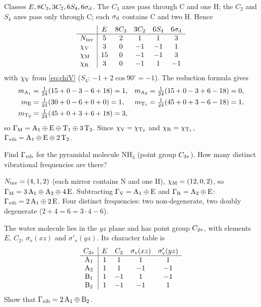 \begin{solution}
Classes $E,8C_3,3C_2,6S_4,6\sigma_{\mathrm{d}}$. The $C_3$ axes pass through C and one H; the $C_2$ and
$S_4$ axes pass only through C; each $\sigma_{\mathrm{d}}$ contains C and two H. Hence
\[
\begin{array}{l|ccccc}
 & E & 8C_3 & 3C_2 & 6S_4 & 6\sigma_{\mathrm{d}}\\\hline
N_{\mathrm{inv}} & 5&2&1&1&3\\
\chi_{\mathrm{V}} & 3&0&-1&-1&1\\
\chi_{\mathrm{M}} & 15&0&-1&-1&3\\
\chi_{\mathrm{R}} & 3&0&-1&1&-1
\end{array}
\]
with $\chi_{\mathrm{V}}$ from \eqref{eq:chiV} ($S_4$: $-1+2\cos90^\circ=-1$). The reduction formula
gives
\begin{align*}
m_{\mathrm{A}_1}&=\tfrac1{24}(15+0-3-6+18)=1, &
m_{\mathrm{A}_2}&=\tfrac1{24}(15+0-3+6-18)=0,\\
m_{\mathrm{E}}&=\tfrac1{24}(30+0-6+0+0)=1, &
m_{\mathrm{T}_1}&=\tfrac1{24}(45+0+3-6-18)=1,\\
m_{\mathrm{T}_2}&=\tfrac1{24}(45+0+3+6+18)=3,
\end{align*}
so $\Gamma_{\mathrm{M}}=\mathrm{A}_1\oplus\mathrm{E}\oplus\mathrm{T}_1\oplus3\,\mathrm{T}_2$. Since
$\chi_{\mathrm{V}}=\chi_{\mathrm{T}_2}$ and $\chi_{\mathrm{R}}=\chi_{\mathrm{T}_1}$,
$\Gamma_{\mathrm{vib}}=\mathrm{A}_1\oplus\mathrm{E}\oplus2\,\mathrm{T}_2$.
\end{solution}

\begin{exercise}[ammonia]\label{ex:2:NH3}
Find $\Gamma_{\mathrm{vib}}$ for the pyramidal molecule $\mathrm{NH_3}$ (point group $C_{3\mathrm{v}}$). How
many distinct vibrational frequencies are there?
\end{exercise}

\begin{solution}
$N_{\mathrm{inv}}=(4,1,2)$ (each mirror contains N and one H), $\chi_{\mathrm{M}}=(12,0,2)$, so
$\Gamma_{\mathrm{M}}=3\,\mathrm{A}_1\oplus\mathrm{A}_2\oplus4\,\mathrm{E}$. Subtracting
$\Gamma_{\mathrm{V}}=\mathrm{A}_1\oplus\mathrm{E}$ and $\Gamma_{\mathrm{R}}=\mathrm{A}_2\oplus\mathrm{E}$:
$\Gamma_{\mathrm{vib}}=2\,\mathrm{A}_1\oplus2\,\mathrm{E}$. Four distinct frequencies: two non-degenerate, two
doubly degenerate ($2+4=6=3\cdot4-6$).
\end{solution}

\begin{exercise}[water]\label{ex:2:H2O}
The water molecule lies in the $yz$ plane and has point group $C_{2\mathrm{v}}$, with elements
$E$, $C_2$, $\sigma_{\mathrm{v}}(xz)$ and $\sigma'_{\mathrm{v}}(yz)$. Its character table is
\[
\begin{array}{c|cccc}
C_{2\mathrm{v}} & E & C_2 & \sigma_{\mathrm{v}}(xz) & \sigma'_{\mathrm{v}}(yz)\\\hline
\mathrm{A}_1 & 1&1&1&1\\ \mathrm{A}_2&1&1&-1&-1\\ \mathrm{B}_1&1&-1&1&-1\\ \mathrm{B}_2&1&-1&-1&1
\end{array}
\]
Show that $\Gamma_{\mathrm{vib}}=2\,\mathrm{A}_1\oplus\mathrm{B}_2$.
\end{exercise}

